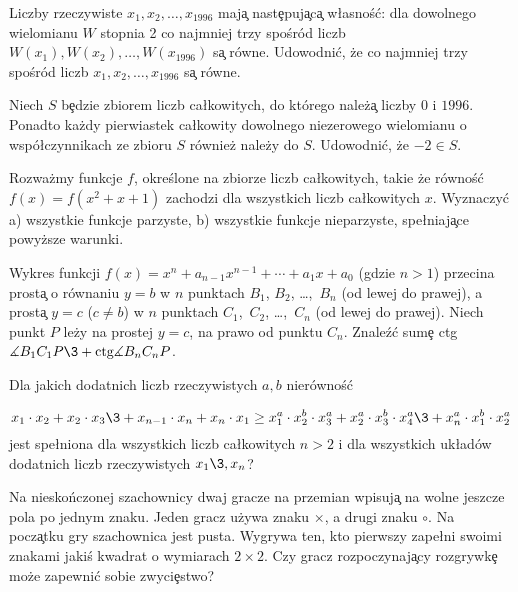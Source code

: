 \prob  %
Liczby rzeczywiste $x_{1},x_{2},\ldots ,x_{1996}$         
maj\c a nast\c epuj\c ac\c a w\l asno\'s\'c: dla dowolnego wielomianu 
$W$  stopnia 2 co najmniej trzy spo\'sr\'od liczb
$W(x_{1}),W(x_{2}),\ldots ,W(x_{1996})$  s\c a r\'owne.
Udowodni\'c, \.ze co najmniej trzy spo\'sr\'od liczb                           
$x_{1},x_{2},\ldots ,x_{1996}$   s\c a r\'owne.




\prob  %
Niech $S$ b\c edzie zbiorem liczb ca\l kowitych, do kt\'orego
nale\.z\c a liczby $0$ i $1996$.   
Po\-nadto ka\.zdy pierwiastek ca\l kowity dowolnego niezerowego
wielomianu o wsp\'o\l czyn\-ni\-kach ze zbioru
$S$ r\'ownie\.z nale\.zy do $S$. Udowodni\'c, \.ze  $-2 \in S.$





\prob %
Rozwa\.zmy funkcje $f$, okre\'slone na zbiorze liczb ca\l kowitych,
takie \.ze  r\'owno\'s\'c $f(x)=f(x^2+x+1)$ zachodzi dla wszystkich 
liczb ca\l kowitych $x$. Wyznaczy\'c a) wszystkie funkcje parzyste, b)
wszystkie funkcje nieparzyste, spe\l niaj\c ace powy\.zsze warunki.  
                                                                            
     



\prob  %
Wykres funkcji $f(x)=x^n+a_{n-1}x^{n-1}+\cdots+a_1x+a_0$  (gdzie     
$n>1$) przecina prost\c a o r\'ownaniu
$y=b$ w $n$ punktach  $B_1$, $B_2$, \dots,~$B_n$ (od lewej do prawej),
a prost\c a $y=c$ ($c\ne b$) w $n$ punktach $C_1$,~$C_2$, \dots,~$C_n$      
(od lewej do prawej). 
Niech punkt $P$ le\.zy na prostej $y=c$, na prawo od punktu $C_n$.
Znale\'z\'c sum\c e ctg$\ang B_1C_1P\3+\hbox{ctg}\ang B_nC_nP$.



\prob   %
Dla jakich dodatnich liczb rzeczywistych $a,b$ nier\'owno\'s\'c
                    
  $$x_1\cdot x_2+x_2\cdot x_3\3+x_{n-1}\cdot x_n+x_n\cdot x_1
    \ge x_1^a\cdot x_2^b\cdot x_3^a+x_2^a\cdot x_3^b\cdot 
        x_4^a\3+x_n^a\cdot x_1^b\cdot x_2^a$$
jest spe\l niona dla wszystkich liczb ca\l kowitych $n>2$ i dla
wszystkich uk\l ad\'ow dodatnich liczb rzeczywistych  $x_1\3,x_n$?



\prob %
Na niesko\'nczonej szachownicy dwaj gracze na przemian wpisuj\c a na
wolne jeszcze pola po jednym znaku. Jeden gracz u\.zywa 
znaku  $\times$, a drugi znaku  $\circ$. Na pocz\c atku gry
szachownica jest pusta. Wygrywa ten, kto pierwszy
zape\l ni swoimi znakami jaki\'s kwadrat o wymiarach                      
$2\times 2$. Czy gracz rozpoczynaj\c acy rozgrywk\c e mo\.ze
zapewni\'c sobie zwyci\c estwo?
           



